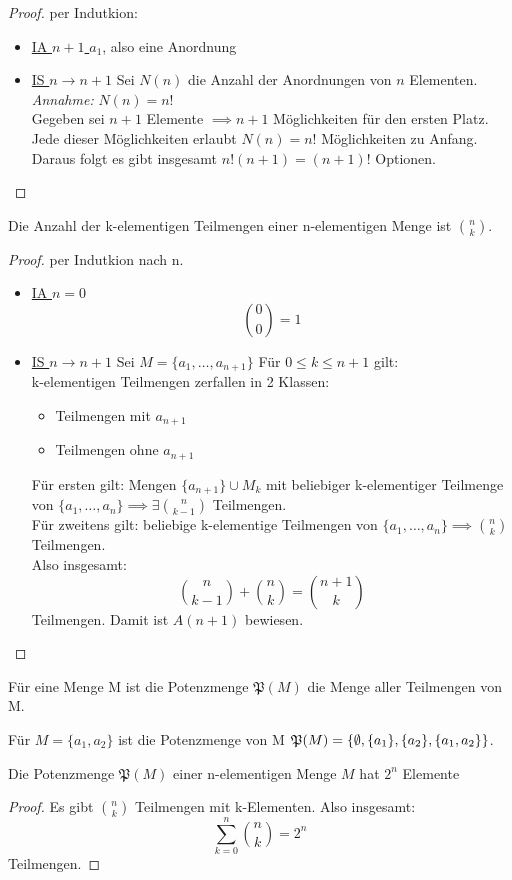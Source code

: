 \begin{proof}
per Indutkion:
\begin{itemize}[label=$\lozenge$, itemsep=2ex]
\item \underline{IA $n+1$ } $a_1$, also eine Anordnung
\item \underline{IS $n \to n+1$}
	Sei $N(n)$ die Anzahl der Anordnungen von $n$ Elementen. \\
	\emph{Annahme:} $N(n)=n!$ \\
	Gegeben sei $n+1$ Elemente $\implies n+1$ Möglichkeiten für den ersten Platz. Jede dieser Möglichkeiten erlaubt $N(n)=n!$ Möglichkeiten zu Anfang.
	Daraus folgt es gibt insgesamt $n! (n+1) = (n+1)!$ Optionen. 
\end{itemize}
\end{proof}
\begin{theorem}
	Die Anzahl der k-elementigen Teilmengen einer n-elementigen Menge ist ${n \choose k}$. 
\end{theorem}
\begin{proof}
per Indutkion nach n.
\begin{itemize}[label=$\lozenge$, itemsep=2ex]
	\item \underline{IA $n=0$}
		\[
		{0 \choose 0} = 1
		\]
	\item \underline{IS $n \to n+1$} 
	Sei $M = \{a_1,\ldots,a_{n+1}\} $ 
	Für $0\le k \le n+1$ gilt: \\
	k-elementigen Teilmengen zerfallen in 2 Klassen:
	\begin{itemize}
		\item Teilmengen mit $a_{n+1}$
		\item Teilmengen ohne $a_{n+1}$ 
	\end{itemize}
	Für ersten gilt: Mengen $\{a_{n+1}\} \cup M_k$ mit beliebiger k-elementiger Teilmenge von $\{a_1,\ldots, a_n\} \implies \exists {n \choose k-1} $ Teilmengen.\\
Für zweitens gilt: beliebige k-elementige Teilmengen von $\{a_1,\ldots,a_n\} \implies {n \choose k}$ Teilmengen. \\
Also insgesamt:
\[
{n \choose k-1} + {n \choose k} = {n+1 \choose k}
\]
Teilmengen. Damit ist $A(n+1)$ bewiesen.
\end{itemize}
\end{proof}
\begin{definition}
Für eine Menge M ist die Potenzmenge $\mathfrak{P}(M)$  die Menge aller Teilmengen von M.
\end{definition}
\begin{example}
Für $M=\{a_1,a_2\} $ ist die Potenzmenge von M $\mathfrak{P}(M)= \{\emptyset,\{a_1\} ,\{a_2\} ,\{a_1,a_2\} \} $.
\end{example}
\begin{theorem}
Die Potenzmenge $\mathfrak{P}(M)$ einer n-elementigen Menge $M$ hat $2^{n}$ Elemente
\end{theorem}
\begin{proof}
Es gibt ${n \choose k}$ Teilmengen mit k-Elementen. Also insgesamt:
\[
\sum_{k=0}^{n}{n \choose k} = 2^{n}
\]
Teilmengen.
\end{proof}

